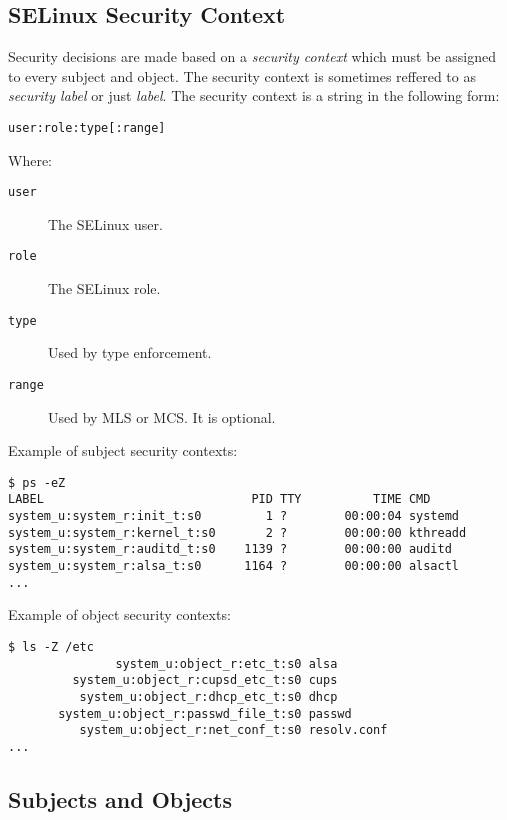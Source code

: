 \subsection{SELinux Security Context}

Security decisions are made based on a \emph{security context} which must be
assigned to every subject and object. The security context is sometimes reffered
to as \emph{security label} or just \emph{label}. The security context is a
string in the following form:
\begin{lstlisting}
user:role:type[:range]
\end{lstlisting}
Where:
\begin{description}
    \item [\texttt{user}] The SELinux user.
    \item [\texttt{role}] The SELinux role.
    \item [\texttt{type}] Used by type enforcement.
    \item [\texttt{range}] Used by MLS or MCS. It is optional.
\end{description}

Example of subject security contexts:
\begin{lstlisting}
$ ps -eZ
LABEL                             PID TTY          TIME CMD
system_u:system_r:init_t:s0         1 ?        00:00:04 systemd
system_u:system_r:kernel_t:s0       2 ?        00:00:00 kthreadd
system_u:system_r:auditd_t:s0    1139 ?        00:00:00 auditd
system_u:system_r:alsa_t:s0      1164 ?        00:00:00 alsactl
...
\end{lstlisting}

Example of object security contexts:
\begin{lstlisting}
$ ls -Z /etc
               system_u:object_r:etc_t:s0 alsa
         system_u:object_r:cupsd_etc_t:s0 cups
          system_u:object_r:dhcp_etc_t:s0 dhcp
       system_u:object_r:passwd_file_t:s0 passwd
          system_u:object_r:net_conf_t:s0 resolv.conf
...
\end{lstlisting}

\subsection{Subjects and Objects}

